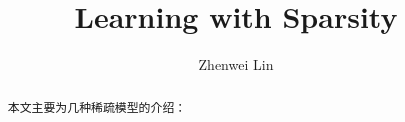 \documentclass[lang=cn,11pt,a4paper]{elegantpaper}
\title{Learning with Sparsity}
\author{Zhenwei Lin }
\date{\zhtoday}
\theoremstyle{plain}
\theoremstyle{remark}
\begin{document}
\maketitle

\begin{abstract}
本文主要为几种稀疏模型的介绍：
\end{abstract}




\end{document}
